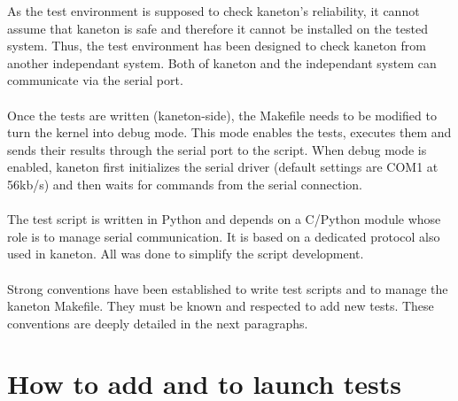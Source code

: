\indent As the test environment is supposed to check kaneton's reliability, it
cannot assume that kaneton is safe and therefore it cannot be installed on the
tested system. Thus, the test environment has been designed to check kaneton
from another independant system. Both of kaneton and the independant system can
communicate via the serial port.\\
\\
\indent Once the tests are written (kaneton-side), the Makefile needs to be
modified to turn the kernel into debug mode. This mode enables the tests,
executes them and sends their results through the serial port to the script.
When debug mode is enabled, kaneton first initializes the serial driver (default
settings are COM1 at 56kb/s) and then waits for commands from the serial
connection.\\
\\
The test script is written in Python and depends on a C/Python module whose
role is to manage serial communication. It is based on a dedicated protocol
also used in kaneton. All was done to simplify the script development.\\
\\
\indent Strong conventions have been established to write test scripts and to
manage the kaneton Makefile. They must be known and respected to add new tests.
These conventions are deeply detailed in the next paragraphs.


\section{How to add and to launch tests}

